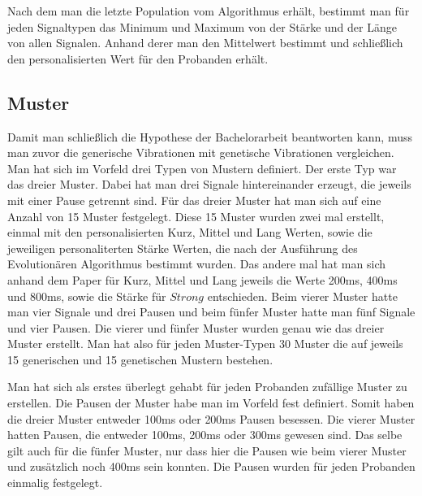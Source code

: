 Nach dem man die letzte Population vom Algorithmus erh{\"a}lt, bestimmt man f{\"u}r jeden Signaltypen das Minimum und Maximum von der St{\"a}rke und der L{\"a}nge von allen Signalen. Anhand derer man den Mittelwert bestimmt und schlie{\ss}lich den personalisierten Wert f{\"u}r den Probanden erh{\"a}lt.

\subsection{Muster}

Damit man schlie{\ss}lich die Hypothese der Bachelorarbeit beantworten kann, muss man zuvor die generische Vibrationen mit genetische Vibrationen vergleichen. 
Man hat sich im Vorfeld drei Typen von Mustern definiert. Der erste Typ war das dreier Muster. Dabei hat man drei Signale hintereinander erzeugt,  die jeweils mit einer Pause getrennt sind. F{\"u}r das dreier Muster hat man sich auf eine Anzahl von 15 Muster festgelegt. Diese 15 Muster wurden zwei mal erstellt, einmal mit den personalisierten Kurz, Mittel und Lang Werten, sowie die jeweiligen personaliterten St{\"a}rke Werten, die nach der Ausf{\"u}hrung des Evolution{\"a}ren Algorithmus bestimmt wurden. Das andere mal hat man sich anhand dem Paper \cite{pescara2016ruttelflug} f{\"u}r Kurz, Mittel und Lang jeweils die Werte 200ms, 400ms und 800ms, sowie die St{\"a}rke f{\"u}r $Strong$ entschieden.  
Beim vierer Muster hatte man vier Signale und drei Pausen und beim f{\"u}nfer Muster hatte man f{\"u}nf Signale und vier Pausen. 
Die vierer und f{\"u}nfer Muster wurden genau wie das dreier Muster erstellt. Man hat also f{\"u}r jeden Muster-Typen 30 Muster die auf jeweils 15 generischen und 15 genetischen Mustern bestehen.


Man hat sich als erstes {\"u}berlegt gehabt f{\"u}r jeden Probanden zuf{\"a}llige Muster zu erstellen. 
Die Pausen der Muster habe man im Vorfeld fest definiert.
Somit haben die dreier Muster entweder 100ms oder 200ms Pausen besessen.
Die vierer Muster hatten Pausen, die entweder 100ms, 200ms oder 300ms gewesen sind. Das selbe gilt auch f{\"u}r die f{\"u}nfer Muster, nur dass hier die Pausen wie beim vierer Muster und zus{\"a}tzlich noch 400ms sein konnten.
Die Pausen wurden f{\"u}r jeden Probanden einmalig festgelegt.

